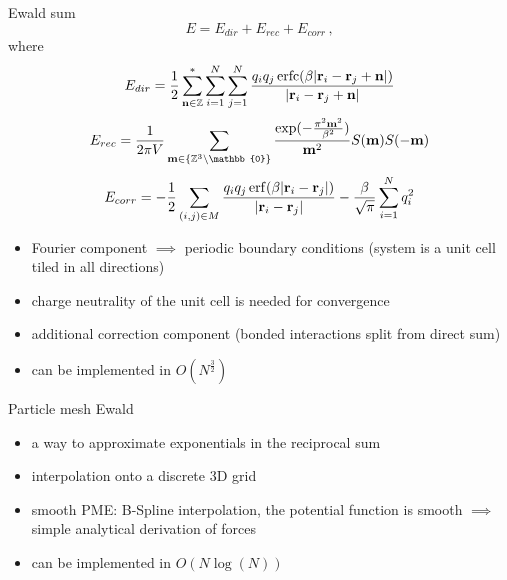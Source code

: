 \documentclass[11pt]{beamer}
\DeclareMathOperator\erf{erf}
\DeclareMathOperator\erfc{erfc}
\begin{document}
\begin{frame}{Ewald sum}
\[E = E_{dir} + E_{rec} + E_{corr}\,\mathrm{,}\]
where
\begin{equation} \label{eq:Edir}
E_{dir} = \frac{1}{2}\sum\limits_{\bold{n\in \mathbb{Z}}}^*\sum\limits_{i=1}^N\sum\limits_{j=1}^N\frac{q_i q_j \erfc(\beta\lvert\bold{r}_i - \bold{r}_j + \bold{n} \rvert)}{\lvert\bold{r}_i - \bold{r}_j + \bold{n} \rvert}
\end{equation}
\begin{equation} \label{eq:Erec}
E_{rec}=\frac{1}{2\pi V}\sum\limits_{\bold{m} \in \{\mathbb{Z}^3 \setminus \mathbb{0}\}}\frac{\exp(-\frac{\pi^2\bold{m}^2}{\beta^2})}{\bold{m}^2}S(\bold{m})S(\bold{-m})
\end{equation}
\[E_{corr} = -\frac{1}{2}\sum\limits_{(i,j)\in M}\frac{q_i q_j \erf(\beta\lvert\bold{r}_i - \bold{r}_j\rvert)}{\lvert\bold{r}_i - \bold{r}_j\rvert} - \frac{\beta}{\sqrt{\pi}}\sum\limits_{i=1}^N q_i^2\]
\begin{itemize}
\item Fourier component $\implies$ periodic boundary conditions (system is a unit cell tiled in all directions)
\item charge neutrality of the unit cell is needed for convergence
\item additional correction component (bonded interactions split from direct sum)
\item can be implemented in $O(N^\frac{3}{2})$

\end{itemize}
\end{frame}

\begin{frame}{Particle mesh Ewald}
\begin{itemize}
\item a way to approximate exponentials in the reciprocal sum 
\item interpolation onto a discrete 3D grid
\item smooth PME: B-Spline interpolation, the potential function is smooth $\implies$ simple analytical derivation of forces
\item can be implemented in $O(N \log(N))$
\end{itemize}
\end{frame}
\end{document}
